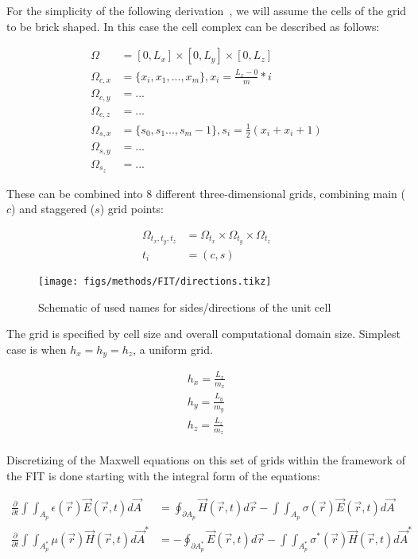     For the simplicity of the following derivation~\cite{rahimi2011finite}, we will assume the cells of the grid to be brick shaped. In this
    case the cell complex can be described as follows:

    \begin{align}
        \Omega &= [0, L_x]\times[0, L_y]\times[0, L_z] \\
        \Omega_{c,x} &= \{x_i, x_1, ..., x_m\}, x_i = \frac{L_x - 0}{m}*i \\
        \Omega_{c,y} &= ... \\
        \Omega_{c,z} &= ... \\
        \Omega_{s,x} &= \{s_0, s_1 ..., s_m-1\}, s_i = \frac{1}{2}(x_i + x_i+1) \\
        \Omega_{s,y} &= ... \\
        \Omega_{s_z} &= ...
    \end{align}

    These can be combined into 8 different three-dimensional grids, combining main ($c$) and staggered ($s$) grid points:

    \begin{align}
        \Omega_{t_x, t_y, t_z} &= \Omega_{t_x}\times\Omega_{t_y}\times\Omega_{t_z}\\
        t_i &= (c, s)
    \end{align}


    \begin{figure}
        \centering
        \texttt{[image: figs/methods/FIT/directions.tikz]}
        \caption{Schematic of used names for sides/directions of the unit cell}
        \label{fig:Dir_Int}
    \end{figure}


    The grid is specified by cell size and overall computational domain size.
    Simplest case is when $h_x = h_y = h_z$, a uniform grid.

    \begin{align}
        h_x = \frac{L_x}{m_x} \\
        h_y = \frac{L_y}{m_y} \\
        h_z = \frac{L_z}{m_z} \\
    \end{align}

    Discretizing of the Maxwell equations on this set of grids within the framework of the
    FIT is done starting with the integral form of the equations:

    \begin{align}
        \frac{\partial}{\partial t}\int\int_{A_p} \epsilon(\vec{r})\vec{E}(\vec{r},t)d\vec{A}
            &= \oint_{\partial A_p} \vec{H}(\vec{r}, t)d\vec{r} - \int\int_{A_p}\sigma(\vec{r})\vec{E}(\vec{r}, t)d\vec{A} \\
        \frac{\partial}{\partial t}\int\int_{A_p^*} \mu(\vec{r})\vec{H}(\vec{r}, t)d\vec{A}^*
            &= -\oint_{\partial A_p^*} \vec{E}(\vec{r},t)d\vec{r} - \int\int_{A_p^*}\sigma^*(\vec{r})\vec{H}(\vec{r},t)d\vec{A}^*\\
    \end{align}

